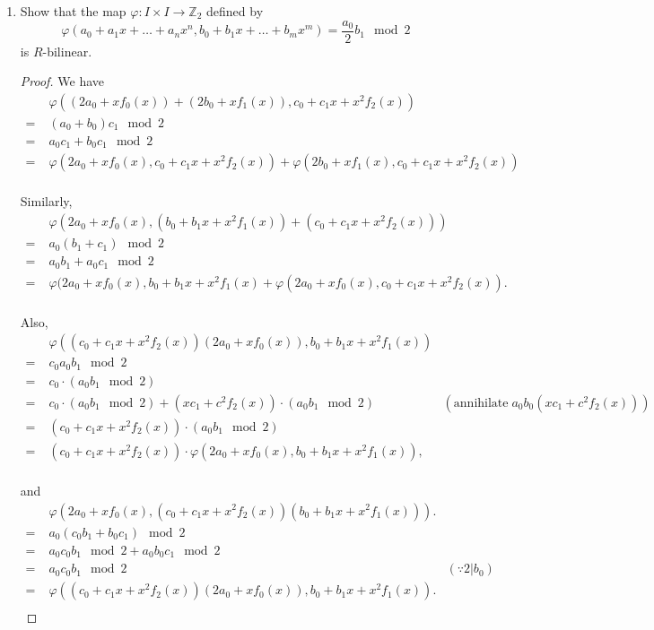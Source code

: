 \documentclass{article}
\begin{document}
  \begin{enumerate}[label={(\alph*)}]
    \item Show that the map $\varphi:I\times I\rightarrow\mathbb{Z}_2$
      defined by
      \[\varphi(a_0+a_1x+\ldots+a_nx^n, b_0+b_1x+\ldots+b_mx^m)
      =\frac{a_0}{2}b_1\mod{2}\]
      is $R$-bilinear.

      \begin{proof}
        We have
        \begin{align*}
          &\;\varphi((2a_0+xf_0(x))+(2b_0+xf_1(x)), c_0+c_1x+x^2f_2(x))\\
          =&\;(a_0+b_0)c_1\mod{2}\\
          =&\;a_0c_1+b_0c_1\mod{2}\\
          =&\;\varphi(2a_0+xf_0(x), c_0+c_1x+x^2f_2(x))
            +\varphi(2b_0+xf_1(x), c_0+c_1x+x^2f_2(x))\\
        \end{align*}

        Similarly,
        \begin{align*}
          &\;\varphi(2a_0+xf_0(x), (b_0+b_1x+x^2f_1(x))
            +(c_0+c_1x+x^2f_2(x)))\\
          =&\;a_0(b_1+c_1)\mod{2}\\
          =&\;a_0b_1+a_0c_1\mod{2}\\
          =&\;\varphi(2a_0+xf_0(x), b_0+b_1x+x^2f_1(x)
            +\varphi(2a_0+xf_0(x), c_0+c_1x+x^2f_2(x)).\\
        \end{align*}

        Also,
        \begin{align*}
          &\;\varphi((c_0+c_1x+x^2f_2(x))(2a_0+xf_0(x)),
            b_0+b_1x+x^2f_1(x))\\
          =&\;c_0a_0b_1\mod{2}\\
          =&\;c_0\cdot(a_0b_1\mod{2})\\
          =&\;c_0\cdot (a_0b_1\mod{2}) +(xc_1+c^2f_2(x))\cdot (a_0b_1\mod{2})
            &(\text{annihilate}\;
            a_0b_0(xc_1+c^2f_2(x)))\\
          =&\;(c_0+c_1x+x^2f_2(x))\cdot (a_0b_1\mod{2})\\
          =&\;(c_0+c_1x+x^2f_2(x))\cdot \varphi(2a_0+xf_0(x),
            b_0+b_1x+x^2f_1(x)),\\
        \end{align*}

        and
        \begin{align*}
          &\;\varphi(2a_0+xf_0(x),
            (c_0+c_1x+x^2f_2(x))(b_0+b_1x+x^2f_1(x))).\\
          =&\;a_0(c_0b_1+b_0c_1)\mod{2}\\
          =&\;a_0c_0b_1\mod{2} +a_0b_0c_1\mod{2}\\
          =&\;a_0c_0b_1\mod{2} &(\because 2|b_0)\\
          =&\;\varphi((c_0+c_1x+x^2f_2(x))(2a_0+xf_0(x)),
            b_0+b_1x+x^2f_1(x)).\\
        \end{align*}
      \end{proof}


\end{enumerate}
\end{document}
